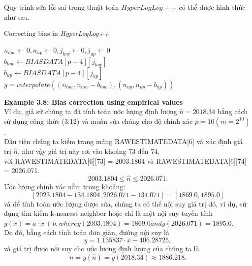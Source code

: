 \documentclass[letterpaper,13pt]{article}
\theoremstyle{mytheor}
\begin{document}
\indent Quy trình sửa lỗi sai trong thuật toán $HyperLogLog++$ có thể được hình thức như sau.\\
\begin{algorithm}[H]
    \vspace{0.25cm}
    \DontPrintSemicolon
    \LinesNumberedHidden
    \caption[]{Correcting bias in \textit{HyperLogLog++}}
    $n_{low} \gets 0, n_{up} \gets 0, j_{low} \gets 0, j_{up} \gets 0 $\\
    $b_{low} \gets BIASDATA[p-4][j_{low}]$\\
    $b_{up} \gets BIASDATA[p-4][j_{up}]$\\
    $y = interpolate\left(\left(n_{low}, n_{low} - b_{low}\right), \left(n_{up}, n_{up} - b_{up
    }\right)\right)$\\
    \vspace{0.25cm}
\end{algorithm}
\begin{mdframed}
    \vspace{0.25cm}
    \textbf{Example 3.8: Bias correction using empirical values}\\
    Ví dụ, giả sử chúng ta đã tính toán ước lượng định lượng $\hat{n} = 2018.34$ bằng cách sử dụng công thức (3.12) và muốn sửa chúng cho 
    độ chính xác $p = 10 (m = 2^{10})$.\\
    Đầu tiên chúng ta kiểm trang mảng RAWESTIMATEDATA[6] và xác định giá trị $\hat{n}$, như vậy giá trị này rơi vào khoảng 73 đến 74,\\ với RAWESTIMATEDATA[6][73] = 2003.1804 và
    RAWESTIMATEDATA[6][74] = 2026.071.
    \[2003.1804 \le \hat{n} \le 2026.071.\]
    Ước lượng chính xác nằm trong khoảng:
    \[\left[2023.1804 - 134.1804, 2026.071 - 131.071\right] = \left[1869.0, 1895.0\right]\]
    và để tính toán ước lượng được sửa, chúng ta có thể nội suy giá trị đó, ví dụ, sử dụng tìm kiếm k-nearest neighbor hoặc chỉ là một nội suy tuyến tính\\
    $y(x) = a \cdot x + b, where y(2003.1804) = 1869.0 and y(2026.071) = 1895.0.$\\
    Do đó, bằng cách tính toán đơn giản, đường nội suy là
    \[y = 1.135837 \cdot x - 406.28725,\]
    và giá trị được nội suy cho ước lượng định lượng của chúng ta là
    \[n = y(\hat{n}) = y(2018.34) \approx 1886.218.\]
    
\end{mdframed}
\end{document}
